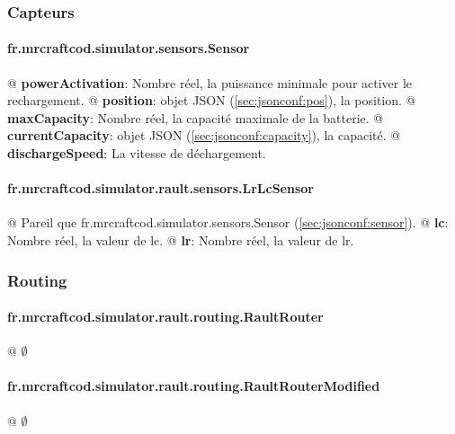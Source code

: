 \documentclass[final]{polytech/polytech}
\begin{document}
			\subsubsection{Capteurs}
				\paragraph{fr.mrcraftcod.simulator.sensors.Sensor\label{sec:jsonconf:sensor}}
					\begin{easylist}[itemize]
						@ \textbf{powerActivation}: Nombre réel, la puissance minimale pour activer le rechargement.
						@ \textbf{position}: objet JSON (\autoref{sec:jsonconf:pos}), la position.
						@ \textbf{maxCapacity}: Nombre réel, la capacité maximale de la batterie.
						@ \textbf{currentCapacity}: objet JSON (\autoref{sec:jsonconf:capacity}), la capacité.
						@ \textbf{dischargeSpeed}: La vitesse de déchargement.
					\end{easylist}
					
				\paragraph{fr.mrcraftcod.simulator.rault.sensors.LrLcSensor}
					\begin{easylist}[itemize]
						@ Pareil que fr.mrcraftcod.simulator.sensors.Sensor (\autoref{sec:jsonconf:sensor}).
						@ \textbf{lc}: Nombre réel, la valeur de lc.
						@ \textbf{lr}: Nombre réel, la valeur de lr.
					\end{easylist}
					
			\subsubsection{Routing}
				\paragraph{fr.mrcraftcod.simulator.rault.routing.RaultRouter}
					\begin{easylist}[itemize]
						@ $\emptyset$
					\end{easylist}
					
				\paragraph{fr.mrcraftcod.simulator.rault.routing.RaultRouterModified}
					\begin{easylist}[itemize]
						@ $\emptyset$
					\end{easylist}
					
\end{document}

